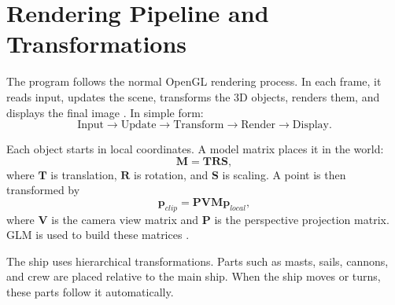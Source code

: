 \documentclass[12pt,a4paper]{report}
\begin{document}
\section{Rendering Pipeline and Transformations}
The program follows the normal OpenGL rendering process. In each frame, it reads input, updates the scene, transforms the 3D objects, renders them, and displays the final image \cite{foley,openglref,glsl}. In simple form:
\begin{equation}
\text{Input} \rightarrow \text{Update} \rightarrow \text{Transform} \rightarrow \text{Render} \rightarrow \text{Display}.
\end{equation}

Each object starts in local coordinates. A model matrix places it in the world:
\begin{equation}
\mathbf{M}=\mathbf{T}\mathbf{R}\mathbf{S},
\end{equation}
where \(\mathbf{T}\) is translation, \(\mathbf{R}\) is rotation, and \(\mathbf{S}\) is scaling. A point is then transformed by
\begin{equation}
\mathbf{p}_{clip}=\mathbf{P}\mathbf{V}\mathbf{M}\mathbf{p}_{local},
\end{equation}
where \(\mathbf{V}\) is the camera view matrix and \(\mathbf{P}\) is the perspective projection matrix. GLM is used to build these matrices \cite{glm}.

The ship uses hierarchical transformations. Parts such as masts, sails, cannons, and crew are placed relative to the main ship. When the ship moves or turns, these parts follow it automatically.
\end{document}
